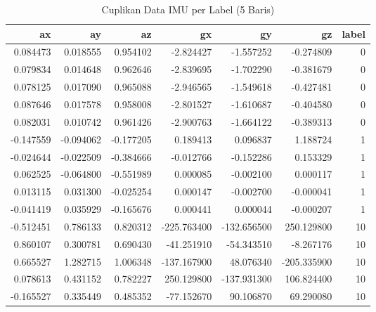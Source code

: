 \begin{table}[htbp]
\centering
\begin{table}
\caption{Cuplikan Data IMU per Label (5 Baris)}
\label{tab:cuplikan_imu}
\begin{tabular}{rrrrrrr}
\toprule
ax & ay & az & gx & gy & gz & label \\
\midrule
0.084473 & 0.018555 & 0.954102 & -2.824427 & -1.557252 & -0.274809 & 0 \\
0.079834 & 0.014648 & 0.962646 & -2.839695 & -1.702290 & -0.381679 & 0 \\
0.078125 & 0.017090 & 0.965088 & -2.946565 & -1.549618 & -0.427481 & 0 \\
0.087646 & 0.017578 & 0.958008 & -2.801527 & -1.610687 & -0.404580 & 0 \\
0.082031 & 0.010742 & 0.961426 & -2.900763 & -1.664122 & -0.389313 & 0 \\
-0.147559 & -0.094062 & -0.177205 & 0.189413 & 0.096837 & 1.188724 & 1 \\
-0.024644 & -0.022509 & -0.384666 & -0.012766 & -0.152286 & 0.153329 & 1 \\
0.062525 & -0.064800 & -0.551989 & 0.000085 & -0.002100 & 0.000117 & 1 \\
0.013115 & 0.031300 & -0.025254 & 0.000147 & -0.002700 & -0.000041 & 1 \\
-0.041419 & 0.035929 & -0.165676 & 0.000441 & 0.000044 & -0.000207 & 1 \\
-0.512451 & 0.786133 & 0.820312 & -225.763400 & -132.656500 & 250.129800 & 10 \\
0.860107 & 0.300781 & 0.690430 & -41.251910 & -54.343510 & -8.267176 & 10 \\
0.665527 & 1.282715 & 1.006348 & -137.167900 & 48.076340 & -205.335900 & 10 \\
0.078613 & 0.431152 & 0.782227 & 250.129800 & -137.931300 & 106.824400 & 10 \\
-0.165527 & 0.335449 & 0.485352 & -77.152670 & 90.106870 & 69.290080 & 10 \\
\bottomrule
\end{tabular}
\end{table}
\end{table}
